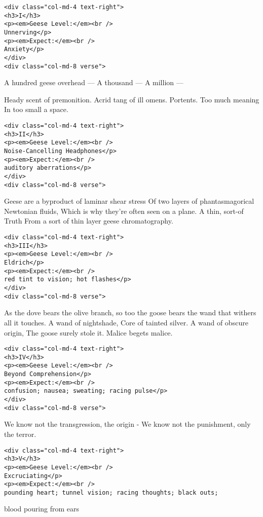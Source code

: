 \begin{verbatim}
<div class="col-md-4 text-right">
<h3>I</h3>
<p><em>Geese Level:</em><br />
Unnerving</p>
<p><em>Expect:</em><br />
Anxiety</p>
</div>
<div class="col-md-8 verse">
\end{verbatim}

A hundred geese overhead --- A thousand --- A million ---

Heady scent of premonition. Acrid tang of ill omens. Portents. Too much meaning In too small a space.

\begin{verbatim}
<div class="col-md-4 text-right">
<h3>II</h3>
<p><em>Geese Level:</em><br />
Noise-Cancelling Headphones</p>
<p><em>Expect:</em><br />
auditory aberrations</p>
</div>
<div class="col-md-8 verse">
\end{verbatim}

Geese are a byproduct of laminar shear stress Of two layers of phantasmagorical Newtonian fluids, Which is why they're often seen on a plane. A thin, sort-of Truth From a sort of thin layer geese chromatography.

\begin{verbatim}
<div class="col-md-4 text-right">
<h3>III</h3>
<p><em>Geese Level:</em><br />
Eldrich</p>
<p><em>Expect:</em><br />
red tint to vision; hot flashes</p>
</div>
<div class="col-md-8 verse">
\end{verbatim}

As the dove bears the olive branch, so too the goose bears the wand that withers all it touches. A wand of nightshade, Core of tainted silver. A wand of obscure origin, The goose surely stole it. Malice begets malice.

\begin{verbatim}
<div class="col-md-4 text-right">
<h3>IV</h3>
<p><em>Geese Level:</em><br />
Beyond Comprehension</p>
<p><em>Expect:</em><br />
confusion; nausea; sweating; racing pulse</p>
</div>
<div class="col-md-8 verse">
\end{verbatim}

We know not the transgression, the origin - We know not the punishment, only the terror.

\begin{verbatim}
<div class="col-md-4 text-right">
<h3>V</h3>
<p><em>Geese Level:</em><br />
Excruciating</p>
<p><em>Expect:</em><br />
pounding heart; tunnel vision; racing thoughts; black outs;
\end{verbatim}

blood pouring from ears

